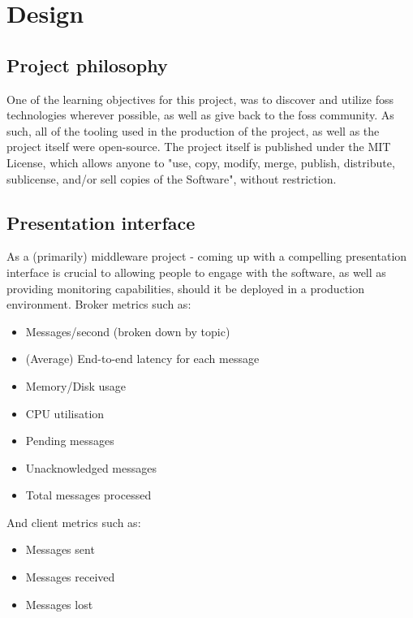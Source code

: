 \chapter{Design}
\label{chap:Design}

\section{Project philosophy}
\label{sec:Project philosophy}

One of the learning objectives for this project, was to discover and utilize
\gls{foss} technologies wherever possible, as well as give back to the
\gls{foss} community. As such, all of the tooling used in the production of the
project, as well as the project itself were open-source. The project itself is
published under the MIT License, which allows anyone to "use, copy, modify,
merge, publish, distribute, sublicense, and/or sell copies of the Software",
without restriction.

\section{Presentation interface}
\label{sec:presentation}

As a (primarily) middleware project - coming up with a compelling presentation
interface is crucial to allowing people to engage with the software, as well as
providing monitoring capabilities, should it be deployed in a production
environment. Broker metrics such as:

\begin{itemize}
  \item Messages/second (broken down by topic)
  \item (Average) End-to-end latency for each message
  \item Memory/Disk usage
  \item CPU utilisation
  \item Pending messages
  \item Unacknowledged messages
  \item Total messages processed
\end{itemize}

And client metrics such as:

\begin{itemize}
  \item Messages sent
  \item Messages received
  \item Messages lost
\end{itemize}

